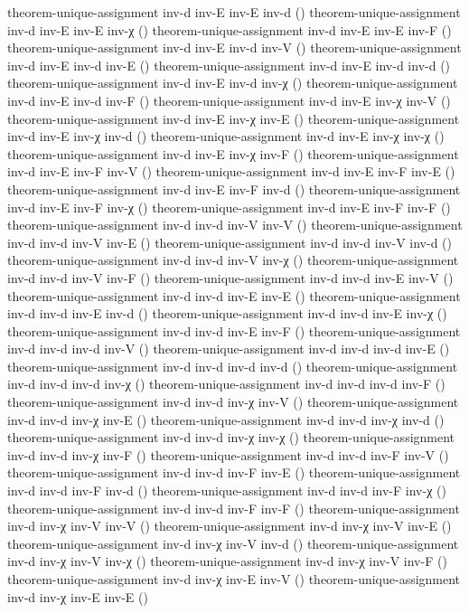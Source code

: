 \documentclass[11pt,a4paper]{article}
\begin{document}
\begin{code}
theorem-unique-assignment inv-d inv-E inv-E inv-d ()
theorem-unique-assignment inv-d inv-E inv-E inv-χ ()
theorem-unique-assignment inv-d inv-E inv-E inv-F ()
theorem-unique-assignment inv-d inv-E inv-d inv-V ()
theorem-unique-assignment inv-d inv-E inv-d inv-E ()
theorem-unique-assignment inv-d inv-E inv-d inv-d ()
theorem-unique-assignment inv-d inv-E inv-d inv-χ ()
theorem-unique-assignment inv-d inv-E inv-d inv-F ()
theorem-unique-assignment inv-d inv-E inv-χ inv-V ()
theorem-unique-assignment inv-d inv-E inv-χ inv-E ()
theorem-unique-assignment inv-d inv-E inv-χ inv-d ()
theorem-unique-assignment inv-d inv-E inv-χ inv-χ ()
theorem-unique-assignment inv-d inv-E inv-χ inv-F ()
theorem-unique-assignment inv-d inv-E inv-F inv-V ()
theorem-unique-assignment inv-d inv-E inv-F inv-E ()
theorem-unique-assignment inv-d inv-E inv-F inv-d ()
theorem-unique-assignment inv-d inv-E inv-F inv-χ ()
theorem-unique-assignment inv-d inv-E inv-F inv-F ()
theorem-unique-assignment inv-d inv-d inv-V inv-V ()
theorem-unique-assignment inv-d inv-d inv-V inv-E ()
theorem-unique-assignment inv-d inv-d inv-V inv-d ()
theorem-unique-assignment inv-d inv-d inv-V inv-χ ()
theorem-unique-assignment inv-d inv-d inv-V inv-F ()
theorem-unique-assignment inv-d inv-d inv-E inv-V ()
theorem-unique-assignment inv-d inv-d inv-E inv-E ()
theorem-unique-assignment inv-d inv-d inv-E inv-d ()
theorem-unique-assignment inv-d inv-d inv-E inv-χ ()
theorem-unique-assignment inv-d inv-d inv-E inv-F ()
theorem-unique-assignment inv-d inv-d inv-d inv-V ()
theorem-unique-assignment inv-d inv-d inv-d inv-E ()
theorem-unique-assignment inv-d inv-d inv-d inv-d ()
theorem-unique-assignment inv-d inv-d inv-d inv-χ ()
theorem-unique-assignment inv-d inv-d inv-d inv-F ()
theorem-unique-assignment inv-d inv-d inv-χ inv-V ()
theorem-unique-assignment inv-d inv-d inv-χ inv-E ()
theorem-unique-assignment inv-d inv-d inv-χ inv-d ()
theorem-unique-assignment inv-d inv-d inv-χ inv-χ ()
theorem-unique-assignment inv-d inv-d inv-χ inv-F ()
theorem-unique-assignment inv-d inv-d inv-F inv-V ()
theorem-unique-assignment inv-d inv-d inv-F inv-E ()
theorem-unique-assignment inv-d inv-d inv-F inv-d ()
theorem-unique-assignment inv-d inv-d inv-F inv-χ ()
theorem-unique-assignment inv-d inv-d inv-F inv-F ()
theorem-unique-assignment inv-d inv-χ inv-V inv-V ()
theorem-unique-assignment inv-d inv-χ inv-V inv-E ()
theorem-unique-assignment inv-d inv-χ inv-V inv-d ()
theorem-unique-assignment inv-d inv-χ inv-V inv-χ ()
theorem-unique-assignment inv-d inv-χ inv-V inv-F ()
theorem-unique-assignment inv-d inv-χ inv-E inv-V ()
theorem-unique-assignment inv-d inv-χ inv-E inv-E ()

\end{code}
\end{document}
